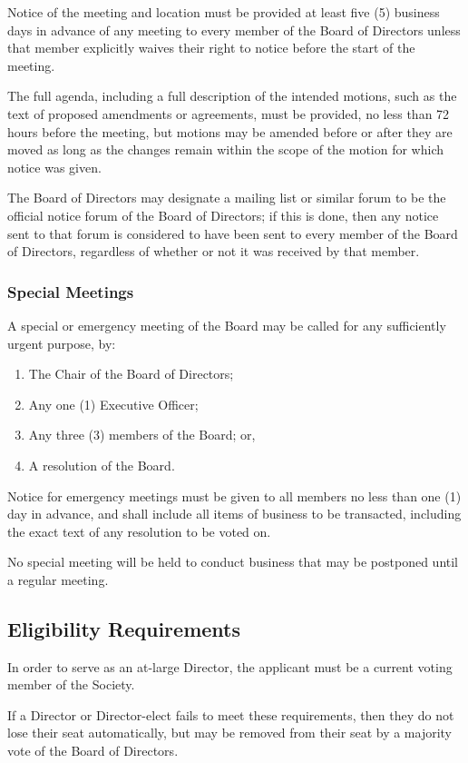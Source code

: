 Notice of the meeting and location must be provided at least five (5) business 
days in advance of any meeting to every member of the Board of Directors unless 
that member explicitly waives their right to notice before the start of the meeting.

The full agenda, including a full description of the intended motions, such as 
the text of proposed amendments or agreements, must be provided, no less than 
72 hours before the meeting, but motions may be amended before or after they are 
moved as long as the changes remain within the scope of the motion for which notice was given.

The Board of Directors may designate a mailing list or similar forum to be the
official notice forum of the Board of Directors; if this is done, then any
notice sent to that forum is considered to have been sent to every member of 
the Board of Directors, regardless of whether or not it was received by that
member.

\subsubsection{Special Meetings}
A special or emergency meeting of the Board may be called for any sufficiently
urgent purpose, by:
\begin{enumerate}
    \item The Chair of the Board of Directors; 
    \item Any one (1) Executive Officer;
    \item Any three (3) members of the Board; or,
    \item A resolution of the Board.
\end{enumerate}

Notice for emergency meetings must be given to all members no less than one
(1) day in advance, and shall include all items of business to be transacted,
including the exact text of any resolution to be voted on.

No special meeting will be held to conduct business that may be postponed until 
a regular meeting.

\subsection{Eligibility Requirements}
In order to serve as an at-large Director, the applicant must be a current voting 
member of the Society.

If a Director or Director-elect fails to meet these requirements, then they
do not lose their seat automatically, but may be removed from their seat by a
majority vote of the Board of Directors.

